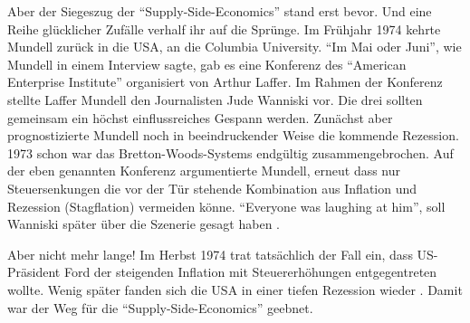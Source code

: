 Aber der Siegeszug der "`Supply-Side-Economics"' stand erst bevor. Und eine Reihe glücklicher Zufälle verhalf ihr auf die Sprünge. Im Frühjahr 1974 kehrte Mundell zurück in die USA, an die Columbia University. "`Im Mai oder Juni"', wie Mundell in einem Interview \parencite{Mundell1998}  sagte, gab es eine Konferenz des "`American Enterprise Institute"' organisiert von Arthur Laffer. Im Rahmen der Konferenz stellte Laffer Mundell den Journalisten Jude Wanniski vor. Die drei sollten gemeinsam ein höchst einflussreiches Gespann werden. Zunächst aber prognostizierte Mundell noch in beeindruckender Weise die kommende Rezession. 1973 schon war das Bretton-Woods-Systems endgültig zusammengebrochen. Auf der eben genannten Konferenz argumentierte Mundell, erneut dass nur Steuersenkungen die vor der Tür stehende Kombination aus Inflation und Rezession (Stagflation) vermeiden könne. "`Everyone was laughing at him"', soll Wanniski später über die Szenerie gesagt haben \parencite[S. 195]{Warsh}.

Aber nicht mehr lange! Im Herbst 1974 trat tatsächlich der Fall ein, dass US-Präsident Ford der steigenden Inflation mit Steuererhöhungen entgegentreten wollte. Wenig später fanden sich die USA in einer tiefen Rezession wieder \parencite[S. 195]{Warsh}. Damit war der Weg für die "`Supply-Side-Economics"' geebnet.

